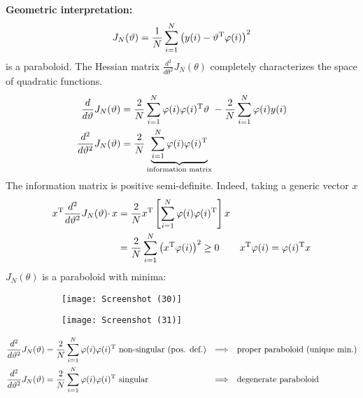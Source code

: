 \textbf{Geometric interpretation:}
\begin{equation*}
J_{N}(\vartheta) =\frac{1}{N}\sum _{i=1}^{N}\left(y(i) -\vartheta ^{\mathrm{T}} \varphi (i)\right)^{2}
\end{equation*}
is a paraboloid. The Hessian matrix $ \frac{d^{2}}{d\theta ^{2}} J_{N}(\theta)$ completely characterizes the space of quadratic functions.
\begin{align*}
\frac{d}{d\vartheta } J_{N}(\vartheta) & =\frac{2}{N}\sum _{i=1}^{N} \varphi (i) \varphi (i)^{\mathrm{T}} \vartheta \ -\frac{2}{N}\sum _{i=1}^{N} \varphi (i) y(i)\\
\frac{d^{2}}{d\vartheta ^{2}} J_{N}(\vartheta) & =\frac{2}{N}\underbrace{\sum _{i=1}^{N} \varphi (i) \varphi (i)^{\mathrm{T}}}_{\text{information matrix}}
\end{align*}
The information matrix is positive semi-definite. Indeed, taking a generic vector $x$
\begin{align*}
x^{\mathrm{T}}\frac{d^{2}}{d\vartheta ^{2}} J_{N}(\vartheta) \cdotp x & =\frac{2}{N} x^{\mathrm{T}}\left[\sum _{i=1}^{N} \varphi (i) \varphi (i)^{\mathrm{T}}\right] x & \\
 & =\frac{2}{N}\sum _{i=1}^{N}\left(x^{\mathrm{T}} \varphi (i)\right)^{2} \geq 0 & x^{\mathrm{T}} \varphi (i) =\varphi (i)^{\mathrm{T}} x
\end{align*}
$ J_{N}(\theta)$ is a paraboloid with minima:
\begin{figure}[htpb]
	\centering
	\begin{subfigure}{.5\textwidth}
		\centering
		\texttt{[image: Screenshot (30)]}
		\label{fig:test1}
	\end{subfigure}%
	\begin{subfigure}{.5\textwidth}
		\centering
		\texttt{[image: Screenshot (31)]}
		\label{fig:test2}
	\end{subfigure}
\end{figure}
\FloatBarrier
\begin{align*}
\frac{d^{2}}{d\vartheta ^{2}} J_{N}(\vartheta) & =\frac{2}{N}\sum _{i=1}^{N} \varphi (i) \varphi (i)^{\mathrm{T}} \text{ non-singular (pos. def.)} & \Longrightarrow\quad& \text{proper paraboloid (unique min.)}\\
\frac{d^{2}}{d\vartheta ^{2}} J_{N}(\vartheta) & =\frac{2}{N}\sum _{i=1}^{N} \varphi (i) \varphi (i)^{\mathrm{T}} \text{ singular} &\Longrightarrow\quad& \text{degenerate paraboloid}
\end{align*}